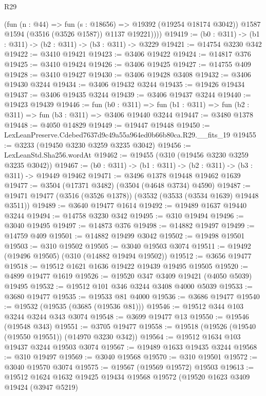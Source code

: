 \begin{lexlean}{R29}
\begin{coremodule}
            (fun (n : @44) => fun (s : @18656) => @19392 (@19254 @18174 @3042))
            @1587
            @1594
            (@3516 (@3526 @1587))
            @1137
            @19221))))
@19419 := (b0 : @311) -> (b1 : @311) -> (b2 : @311) -> (b3 : @311) -> @3229
@19421 := @14754 @3230 @342
@19422 := @3410 @19421
@19423 := @3406 @19422
@19424 := @14817 @376
@19425 := @3410 @19424
@19426 := @3406 @19425
@19427 := @14755 @409
@19428 := @3410 @19427
@19430 := @3406 @19428 @3408
@19432 := @3406 @19430 @3244
@19434 := @3406 @19432 @3244
@19435 := @19426 @19434
@19437 := @3406 @19435 @3244
@19439 := @3406 @19437 @3244
@19440 := @19423 @19439
@19446 := fun (b0 : @311) =>
  fun (b1 : @311) => fun (b2 : @311) => fun (b3 : @311) => @3406 @19440 @3244
@19447 := @3480 @1378
@19448 := @4050 @14829
@19449 := @19447 @19448
@19450 := LexLeanPreserve.Cdebed7637d9c49a55a964ed0b66b80ca.R29.__fits_19
@19455 := @3233 (@19450 @3230 @3259 @3235 @3042)
@19456 := LexLeanStd.Sha256.wordAt
@19462 := @19455 (@310 (@19456 @3230 @3259 @3235 @3042))
@19467 := (b0 : @311) -> (b1 : @311) -> (b2 : @311) -> (b3 : @311) -> @19449 @19462
@19471 := @3496 @1378 @19448 @19462 @1639
@19477 := @3504 (@17371 @3482) (@3504 (@4648 @3734) @4590)
@19487 := @19471 @19477 (@3516 (@3526 @1378)) (@3532 (@3533 (@3534 @1639) @19448 @3511))
@19489 := @3640 @19477 @1614
@19492 := @19489 @1637 @19440 @3244
@19494 := @14758 @3230 @342
@19495 := @310 @19494
@19496 := @3040 @19495
@19497 := @14873 @376
@19498 := @14882 @19497
@19499 := @14759 @409
@19501 := @14882 @19499 @3042
@19502 := @19498 @19501
@19503 := @310 @19502
@19505 := @3040 @19503 @3074
@19511 := @19492 (@19496 @19505) (@310 (@14882 @19494 @19502))
@19512 := @3656 @19477
@19518 := @19512 @1621 @1636 @19422 @19439 @19495 @19505
@19520 := @4899 @19477 @1619
@19526 := @19520 @347 @3409 @19421 (@4050 @5039) @19495
@19532 := @19512 @101 @346 @3244 @3408 @4000 @5039
@19533 := @3680 @19477
@19535 := @19533 @81 @4000
@19536 := @3686 @19477
@19540 := @19532 (@19535 (@3685 (@19536 @81)))
@19546 := @19512 @344 @103 @3244 @3244 @343 @3074
@19548 := @3699 @19477 @13
@19550 := @19546 (@19548 @343)
@19551 := @3705 @19477
@19558 := @19518 (@19526 (@19540 (@19550 @19551)) (@14970 @3230 @342))
@19564 := @19512 @1634 @103 @19437 @3244 @19503 @3074
@19567 := @19489 @1633 @19435 @3244
@19568 := @310 @19497
@19569 := @3040 @19568
@19570 := @310 @19501
@19572 := @3040 @19570 @3074
@19575 := @19567 (@19569 @19572) @19503
@19613 := @19512
    @1624
    @1632
    @19425
    @19434
    @19568
    @19572
    (@19520
      @1623
      @3409
      @19424
      (@3947 @5219)

\end{coremodule}
\end{lexlean}
